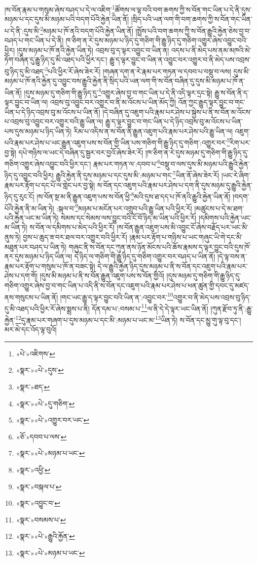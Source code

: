 །ས་བོན་རྣམ་པ་གསུམ་ཞེས་བཤད་པ་དེ་ལ་འཇིག་\footnote{«པེ་»འཇིགས་}ཚོགས་ལ་ལྟ་བའི་བག་ཆགས་ཀྱི་ས་བོན་གང་ཡིན་པ་དེ་ནི་དུས་མཉམ་པ་དང་དུས་མི་མཉམ་པའི་བདག་པོའི་རྐྱེན་ཡིན་ནོ། །སྲིད་པའི་ཡན་ལག་གི་བག་ཆགས་ཀྱི་ས་བོན་གང་ཡིན་པ་དེ་ནི་:དུས་མི་\footnote{«སྣར་»«པེ་»དུས་}མཉམ་པ་ཁོ་ནའི་བདག་པོའི་རྐྱེན་ཡིན་ནོ། །སྤྲོས་པའི་བག་ཆགས་ཀྱི་ས་བོན་རྒྱུའི་རྐྱེན་ཅེས་བྱ་བ་བཤད་པ་གང་ཡིན་པ་དེ་ནི། ཁ་ཅིག་ན་རེ་དུས་མཉམ་པ་ཉིད་དུ་གཅིག་གི་རྒྱུ་ཉིད་དུ་གཅིག་འགྱུར་ཞེས་འབྱུང་བའི་ཕྱིར། །དུས་མཉམ་པ་ཁོ་ནའི་རྐྱེན་ཡིན་ཏེ། འབྲས་བུ་ད་ལྟར་འབྱུང་བ་ཡིན་ན། འདས་པ་ནི་མེད་པས་ནམ་མཁའི་མེ་ཏོག་བཞིན་དུ་རྒྱུ་ཉིད་དུ་མི་འཐད་པའི་ཕྱིར་དང་། རྒྱུ་ད་ལྟར་བྱུང་བ་ཡིན་ན་འབྱུང་བར་འགྱུར་བ་ནི་མེད་པས་འབྲས་བུ་ཉིད་དུ་མི་འཐད་\footnote{«སྣར་»ཐད་}པའི་ཕྱིར་རོ་ཞེས་ཟེར་རོ། །གཞན་དག་ན་རེ་རྣམ་པར་གཏན་ལ་དབབ་པ་བསྡུ་བ་ལས། དུས་མི་མཉམ་པ་ཁོ་ནའི་རྐྱེན་དུ་འབྱུང་བས་རྒྱུའི་རྐྱེན་ནི་སྲིད་པའི་ཡན་ལག་གི་ས་བོན་བཞིན་དུ་དུས་མི་མཉམ་པ་ཁོ་ན་ཡིན་ནོ། །དུས་མཉམ་དུ་གཅིག་གི་རྒྱུ་ཉིད་དུ་\footnote{«སྣར་»«པེ་»དུ་གཅིག་}འགྱུར་ཞེས་བྱ་བ་གང་ཡིན་པ་དེ་ནི་འདི་ལྟར་དྲང་སྟེ། རྒྱུ་ས་བོན་ནི་ད་ལྟར་བྱུང་བ་ཡིན་ལ། འབྲས་བུ་འབྱུང་བར་འགྱུར་བ་ནི་མ་འོངས་པ་ཡིན་མོད་ཀྱི། འོན་ཀྱང་རྒྱུད་ལྟར་བྱུང་བ་གང་ཡིན་པ་དེ་ཉིད་འབྲས་བུ་མ་འོངས་པ་ཡིན་ནོ། །དེ་བཞིན་དུ་འཇུག་པའི་རྣམ་པར་ཤེས་པ་སྐྱེས་པ་ནི་ས་བོན་མ་འོངས་པ་འབྲས་བུ་འབྱུང་བར་འགྱུར་བའི་རྒྱུ་ཡིན་ལ། རྒྱུ་ད་ལྟར་བྱུང་བ་གང་ཡིན་པ་དེ་ཉིད་འབྲས་བུ་མ་འོངས་པ་ཡིན་པས་དུས་མཉམ་པ་ཉིད་ཡིན་ཏེ། རིམ་པ་འདིས་ན་ས་བོན་ནི་རྒྱུན་འཇུག་པའི་རྣམ་པར་ཤེས་པའི་རྒྱུ་ཡིན་ལ། འཇུག་པའི་རྣམ་པར་ཤེས་པ་ཡང་རྒྱུན་འཇུག་པས་ས་བོན་གྱི་ཡིན་པས་གཅིག་གི་རྒྱུ་ཉིད་དུ་གཅིག་:འགྱུར་བར་\footnote{«སྣར་»«པེ་»འགྱུར་བར་ཡང་}རིག་པར་བྱ་སྟེ། དཔེ་གཉིས་ལ་ཡང་དེ་བཞིན་དུ་སྦྱར་བར་བྱའོ་ཞེས་ཟེར་རོ། །ཁ་ཅིག་ན་རེ་དུས་མཉམ་དུ་གཅིག་གི་རྒྱུ་ཉིད་དུ་གཅིག་འགྱུར་ཞེས་འབྱུང་བའི་ཕྱིར་དང་། རྣམ་པར་གཏན་ལ་:དབབ་པ་\footnote{«ཅོ་»དབབ་པ་ལས་}བསྡུ་བ་ལས་དུས་མི་མཉམ་པའི་རྒྱུའི་རྐྱེན་ཉིད་དུ་འབྱུང་བའི་ཕྱིར། རྒྱུའི་རྐྱེན་ནི་དུས་མཉམ་པ་དང་དུས་མི་:མཉམ་པ་གང་\footnote{«སྣར་»«པེ་»མཉམ་པ་ཡང་}ཡིན་ནོ་ཞེས་ཟེར་རོ། །ཡང་རེ་ཞིག་རྣམ་པར་རྟོག་པ་དང་པོ་ལ་གླེང་པར་བྱ་སྟེ། ས་བོན་དང་འཇུག་པའི་རྣམ་པར་ཤེས་པ་དག་ནི་དུས་མཉམ་དུ་རྒྱུའི་རྐྱེན་ཉིད་དུ་རུང་ངོ། །ས་བོན་སྔ་མ་ནི་རྒྱུན་འཇུག་པས་ས་བོན་ཕྱི་\footnote{«སྣར་»འཕྱི་}མའི་དུས་ཐ་དད་པ་ཁོ་ནའི་རྒྱུའི་རྐྱེན་ཡིན་ནོ། །བདག་པོའི་རྐྱེན་ནི་མ་ཡིན་ཏེ། :སྐལ་བ་\footnote{«སྣར་»བསྐལ་པ་}མཉམ་པ་མངོན་པར་འགྲུབ་པའི་རྒྱུ་ཡིན་པའི་ཕྱིར་རོ། །མཚུངས་པ་དེ་མ་ཐག་པའི་རྐྱེན་ཡང་མ་ཡིན་ཏེ། སེམས་དང་སེམས་ལས་བྱུང་བའི་ངོ་བོ་ཉིད་མ་ཡིན་པའི་ཕྱིར་རོ། །དམིགས་པའི་རྐྱེན་ཡང་མ་ཡིན་ཏེ། ས་བོན་ལ་དམིགས་པ་མེད་པའི་ཕྱིར་རོ། །ས་བོན་རྒྱུན་འཇུག་པས་མི་འབྱུང་ངོ་ཞེས་བརྗོད་པར་ཡང་མི་ནུས་ཏེ། བྱས་པ་ཆུད་ཟ་བར་ཐལ་བར་འགྱུར་བའི་ཕྱིར་རོ། །རྣམ་པར་རྟོག་པ་གཉིས་པ་ཡང་གཞུང་ཡི་གེ་དང་མི་མཐུན་པར་བཤད་པ་ཡིན་ཏེ། གཞུང་ནི་ས་བོན་དང་ཀུན་ནས་ཉོན་མོངས་པའི་ཆོས་རྣམས་ད་ལྟར་བྱུང་བའི་དུས་ཁོ་ནར་དུས་མཉམ་པ་ཉིད་ཡིན་ལ། དེ་ཉིད་ལ་གཅིག་གི་རྒྱུ་ཉིད་དུ་གཅིག་འགྱུར་བར་བཤད་པ་ཡིན་ནོ། །དེ་ལྟ་བས་ན་རྣམ་པར་རྟོག་པ་གསུམ་པ་ཁོ་ན་བཟང་སྟེ། དེ་ལ་རྒྱུའི་རྐྱེན་ཉིད་དུས་མཉམ་པ་ནི་ས་བོན་དང་འཇུག་པའི་རྣམ་པར་ཤེས་པ་དག་གོ། །དུས་མི་མཉམ་པ་ནི་ས་བོན་རྒྱུན་འཇུག་པས་ས་བོན་གྱིའོ། །དུས་མཉམ་དུ་གཅིག་གི་རྒྱུ་ཉིད་དུ་གཅིག་འགྱུར་ཞེས་བྱ་བ་གང་ཡིན་པ་འདི་ནི་ས་བོན་དང་འཇུག་པའི་རྣམ་པར་ཤེས་པ་ཕན་ཚུན་གྱི་དབང་དུ་མཛད་ནས་གསུངས་པ་ཡིན་ནོ། །གང་ཡང་རྒྱུ་ད་ལྟར་བྱུང་བའི་ཡིན་ན་:འབྱུང་བར་\footnote{«སྣར་»འབྱུང་བ་}འགྱུར་བ་ནི་མེད་པས་འབྲས་བུ་ཉིད་དུ་མི་འཐད་པའི་ཕྱིར་རོ་ཞེས་སྨྲས་པ་ནི། དོན་དམ་པ་:བསམ་པ་\footnote{«སྣར་»བསམས་པ་}ལ་ནི་དེ་དེ་ལྟར་ཡང་ཡིན་ནོ། །ཀུན་རྫོབ་ཏུ་ནི་:རྒྱུ་རྐྱེན་\footnote{«སྣར་»«པེ་»རྒྱུའི་རྐྱོན་}དུ་རྣམ་པར་གཞག་པ་དུས་མཉམ་པ་དང་མི་:མཉམ་པ་ཡང་མ་\footnote{«སྣར་»«པེ་»མཉམ་པ་ཡང་}ཡིན་ཏེ། ས་བོན་དང་མྱུ་གུ་ལྟ་བུ་དང་། མར་མེ་དང་འོད་ལྟ་བུའོ། 